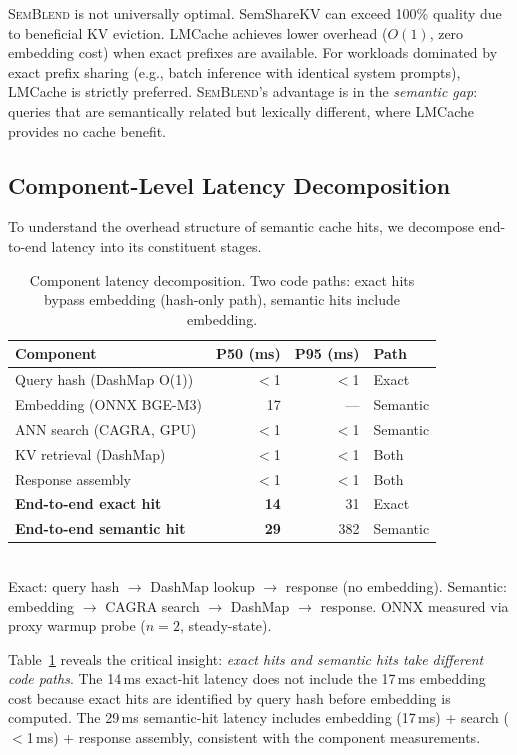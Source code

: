 \documentclass[11pt,twocolumn]{article}
\newcommand{\semblend}{\textsc{SemBlend}\xspace}
\begin{document}
\semblend is not universally optimal. SemShareKV can
exceed 100\% quality due to beneficial KV eviction. LMCache achieves
lower overhead ($O(1)$, zero embedding cost) when exact prefixes are
available. For workloads dominated by exact prefix sharing (e.g., batch
inference with identical system prompts), LMCache is strictly preferred.
\semblend's advantage is in the \emph{semantic gap}: queries that are
semantically related but lexically different, where LMCache provides
no cache benefit.


\subsection{Component-Level Latency Decomposition}
\label{sec:breakdown}

To understand the overhead structure of semantic cache hits, we
decompose end-to-end latency into its constituent stages.

\begin{table}[t]
\centering
\caption{Component latency decomposition. Two code paths: exact hits
bypass embedding (hash-only path), semantic hits include embedding.}
\label{tab:breakdown}
\footnotesize
\setlength{\tabcolsep}{3pt}
\begin{tabular}{@{}lrrl@{}}
\toprule
\textbf{Component} & \textbf{P50 (ms)} & \textbf{P95 (ms)} & \textbf{Path} \\
\midrule
Query hash (DashMap O(1)) & $<$1 & $<$1 & Exact \\
Embedding (ONNX BGE-M3)  & 17   & ---  & Semantic \\
ANN search (CAGRA, GPU)   & $<$1 & $<$1 & Semantic \\
KV retrieval (DashMap)    & $<$1 & $<$1 & Both \\
Response assembly         & $<$1 & $<$1 & Both \\
\midrule
\textbf{End-to-end exact hit}    & \textbf{14} & 31 & Exact \\
\textbf{End-to-end semantic hit} & \textbf{29} & 382 & Semantic \\
\bottomrule
\end{tabular}\\[2pt]
{\footnotesize Exact: query hash $\to$ DashMap lookup $\to$ response
(no embedding). Semantic: embedding $\to$ CAGRA search $\to$ DashMap
$\to$ response. ONNX measured via proxy warmup probe ($n{=}2$,
steady-state).}
\end{table}

Table~\ref{tab:breakdown} reveals the critical insight: \emph{exact hits
and semantic hits take different code paths}. The 14\,ms exact-hit
latency does not include the 17\,ms embedding cost because exact hits
are identified by query hash before embedding is computed. The 29\,ms
semantic-hit latency includes embedding (17\,ms) + search ($<$1\,ms)
+ response assembly, consistent with the component measurements.
\end{document}
